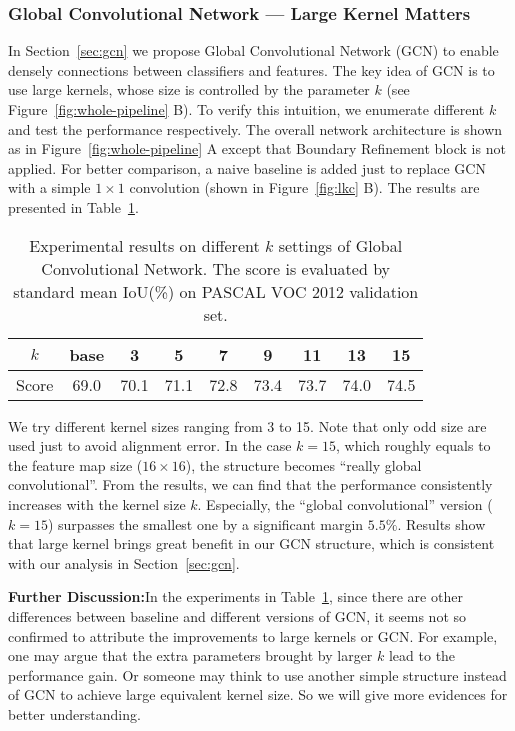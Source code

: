 \documentclass[10pt,twocolumn,letterpaper]{article}
\begin{document}
\subsubsection{Global Convolutional Network --- Large Kernel Matters}
\label{subsubsec:lkc}
	In Section~\ref{sec:gcn} we propose Global Convolutional Network (GCN) to enable densely connections between classifiers and features. The key idea of GCN is to use large kernels, whose size is controlled by the parameter $k$ (see Figure~\ref{fig:whole-pipeline} B). To verify this intuition, we enumerate different $k$ and test the performance respectively. The overall network architecture is shown as in Figure~\ref{fig:whole-pipeline} A except that Boundary Refinement block is not applied. For better comparison, a naive baseline is added just to replace GCN with a simple $1\times 1$ convolution (shown in Figure~\ref{fig:lkc} B). The results are presented in Table~\ref{table:exp-on-gcn}. 
	\begin{table}[h]
	  \small
      \begin{center}	
		\begin{tabular}{|c|c|c|c|c|c|c|c|c|}
			\hline 
			$k$ & base & 3 & 5 & 7 & 9 & 11 & 13 & 15\\
			\hline 
			Score & 69.0 & 70.1 & 71.1 & 72.8 & 73.4 & 73.7 & 74.0 & 74.5 \\
			\hline
		\end{tabular}
      \end{center}
      \caption{Experimental results on different $k$ settings of Global Convolutional Network. The score is evaluated by standard mean IoU(\%) on PASCAL VOC 2012 validation set. }
      \label{table:exp-on-gcn}
   \end{table}
\par
   We try different kernel sizes ranging from 3 to 15. Note that only odd size are used just to avoid alignment error. In the case $k=15$, which roughly equals to the feature map size ($16\times 16$), the structure becomes ``really global convolutional''. From the results, we can find that the performance consistently increases with the kernel size $k$. Especially, the ``global convolutional'' version ($k=15$) surpasses the smallest one by a significant margin $5.5\%$. Results show that large kernel brings great benefit in our GCN structure, which is consistent with our analysis in Section~\ref{sec:gcn}. 
\par
	\textbf{Further Discussion:}\quad In the experiments in Table~\ref{table:exp-on-gcn}, since there are other differences between baseline and different versions of GCN, it seems not so confirmed to attribute the improvements to large kernels or GCN. For example, one may argue that the extra parameters brought by larger $k$ lead to the performance gain. Or someone may think to use another simple structure instead of GCN to achieve large equivalent kernel size. So we will give more evidences for better understanding. 
\end{document}
